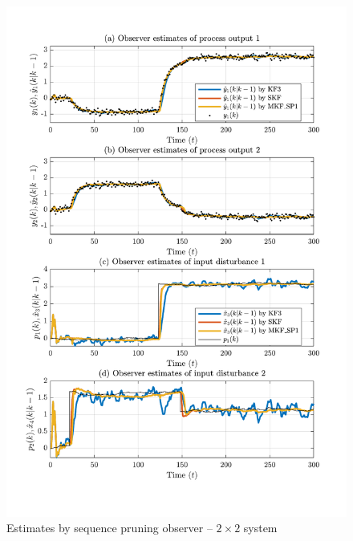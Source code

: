\begin{figure}[htp]
	\centering
	\includegraphics[width=13cm]{images/rod_obs_sim2_all_seed_y_est1_SP1.pdf}
	\caption{Estimates by sequence pruning observer –  $2\times2$ system}
	\label{fig:rod-obs-sim2-yest-1-SP}
\end{figure}

